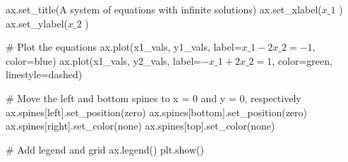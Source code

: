 \documentclass[
  letterpaper,
  DIV=11,
  numbers=noendperiod]{scrreprt}
\newenvironment{Shaded}{\begin{snugshade}}{\end{snugshade}}
\newcommand{\CommentTok}[1]{\textcolor[rgb]{0.37,0.37,0.37}{#1}}
\newcommand{\NormalTok}[1]{\textcolor[rgb]{0.00,0.23,0.31}{#1}}
\newcommand{\OperatorTok}[1]{\textcolor[rgb]{0.37,0.37,0.37}{#1}}
\newcommand{\StringTok}[1]{\textcolor[rgb]{0.13,0.47,0.30}{#1}}
\begin{document}
\begin{Shaded}
\begin{Highlighting}[]
\NormalTok{ax.set\_title(}\StringTok{\textquotesingle{}A system of equations with infinite solutions\textquotesingle{}}\NormalTok{)}
\NormalTok{ax.set\_xlabel(}\StringTok{\textquotesingle{}$x\_1$                                                                                                                            \textquotesingle{}}\NormalTok{)}
\NormalTok{ax.set\_ylabel(}\StringTok{\textquotesingle{}$x\_2$                                                                                                    \textquotesingle{}}\NormalTok{)}

\CommentTok{\# Plot the equations}
\NormalTok{ax.plot(x1\_vals, y1\_vals, label}\OperatorTok{=}\StringTok{\textquotesingle{}$x\_1 {-} 2x\_2 = {-}1$\textquotesingle{}}\NormalTok{, color}\OperatorTok{=}\StringTok{\textquotesingle{}blue\textquotesingle{}}\NormalTok{)}
\NormalTok{ax.plot(x1\_vals, y2\_vals, label}\OperatorTok{=}\StringTok{\textquotesingle{}${-}x\_1 + 2x\_2 = 1$\textquotesingle{}}\NormalTok{, color}\OperatorTok{=}\StringTok{\textquotesingle{}green\textquotesingle{}}\NormalTok{, linestyle}\OperatorTok{=}\StringTok{\textquotesingle{}dashed\textquotesingle{}}\NormalTok{)}

\CommentTok{\# Move the left and bottom spines to x = 0 and y = 0, respectively}
\NormalTok{ax.spines[}\StringTok{\textquotesingle{}left\textquotesingle{}}\NormalTok{].set\_position(}\StringTok{\textquotesingle{}zero\textquotesingle{}}\NormalTok{)}
\NormalTok{ax.spines[}\StringTok{\textquotesingle{}bottom\textquotesingle{}}\NormalTok{].set\_position(}\StringTok{\textquotesingle{}zero\textquotesingle{}}\NormalTok{)}
\NormalTok{ax.spines[}\StringTok{\textquotesingle{}right\textquotesingle{}}\NormalTok{].set\_color(}\StringTok{\textquotesingle{}none\textquotesingle{}}\NormalTok{)}
\NormalTok{ax.spines[}\StringTok{\textquotesingle{}top\textquotesingle{}}\NormalTok{].set\_color(}\StringTok{\textquotesingle{}none\textquotesingle{}}\NormalTok{)}

\CommentTok{\# Add legend and grid}
\NormalTok{ax.legend()}
\NormalTok{plt.show()}
\end{Highlighting}
\end{Shaded}
\end{document}
